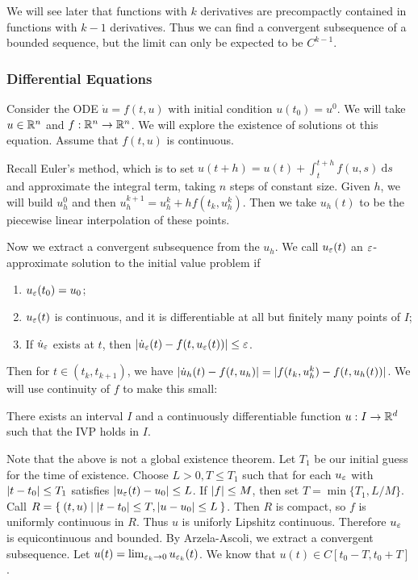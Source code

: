 \documentclass[10pt, twoside]{article}
\renewcommand{\d}{\ \mathrm{d}}
\begin{document}
    \begin{rmk}
        We will see later that functions with $k$ derivatives are precompactly contained in functions with $k-1$ derivatives. Thus we can find a convergent subsequence of a bounded sequence, but the limit can only be expected to be $C^{k-1}$.
    \end{rmk}

    \subsubsection{Differential Equations}

    \begin{exm}
        Consider the ODE $\dot{u} =f(t,u)$ with initial condition $u(t_0) = u^0$. We will take $u \in \mathbb{R}^n$ and $f: \mathbb{R}^n \rightarrow \mathbb{R}^n$. We will explore the existence of solutions ot this equation. Assume that $f(t,u)$ is continuous.

        Recall Euler's method, which is to set $u(t+h) = u(t) + \int_t^{t+h} f(u,s) \d s$ and approximate the integral term, taking $n$ steps of constant size. Given $h$, we will build $u_h^0$ and then $u_h^{k+1} = u_h^k + hf(t_k, u_h^k)$. Then we take $u_h(t)$ to be the piecewise linear interpolation of these points.

        Now we extract a convergent subsequence from the $u_h$. We call $u_{\varepsilon}(t)$ an $\varepsilon$-approximate solution to the initial value problem if \begin{enumerate}
            \item $u_{\varepsilon}(t_0) = u_0$;
            \item $u_{\varepsilon}(t)$ is continuous, and it is differentiable at all but finitely many points of $I$;
            \item If $\dot{u}_{\varepsilon}$ exists at $t$, then $\lvert\dot{u}_{\varepsilon}(t) - f(t, u_{\varepsilon}(t))\rvert \leq \varepsilon$.
        \end{enumerate}

        Then for $t \in (t_k, t_{k+1})$, we have $\lvert\dot{u}_h(t) - f(t,u_h)\rvert = \lvert f(t_k, u_h^k) - f(t, u_h(t))\rvert$. We will use continuity of $f$ to make this small:
        \begin{thm}
            There exists an interval $I$ and a continuously differentiable function $u:I \rightarrow \mathbb{R}^d$ such that the IVP holds in $I$.
        \end{thm}

        Note that the above is not a global existence theorem. Let $T_1$ be our initial guess for the time of existence. Choose $L > 0, T \leq T_1$ such that for each $u_{\varepsilon}$ with $\lvert t-t_0\rvert \leq T_1$ satisfies $\lvert u_{\varepsilon}(t) - u_0\rvert \leq L$. If $\lvert f\rvert \leq M$, then set $T = \min\{T_1, L/M\}$. Call $R = \Set{(t,u) | \lvert t-t_0\rvert \leq T, \lvert u-u_0\rvert \leq L}$. Then $R$ is compact, so $f$ is uniformly continuous in $R$. Thus $u$ is uniforly Lipshitz continuous. Therefore $u_{\varepsilon}$ is equicontinuous and bounded. By Arzela-Ascoli, we extract a convergent subsequence. Let $u(t) = \lim_{\varepsilon_k \rightarrow 0} u_{\varepsilon_k}(t)$. We know that $u(t) \in C[t_0-T, t_0+T]$. 


\end{exm}
\end{document}
